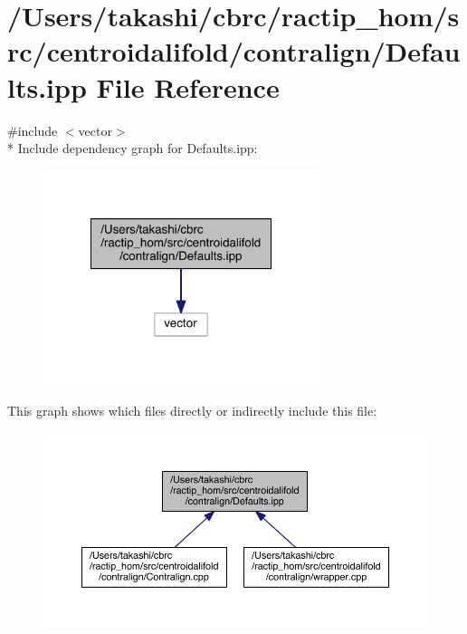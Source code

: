 \hypertarget{centroidalifold_2contralign_2_defaults_8ipp}{\section{/\+Users/takashi/cbrc/ractip\+\_\+hom/src/centroidalifold/contralign/\+Defaults.ipp File Reference}
\label{centroidalifold_2contralign_2_defaults_8ipp}
}
{\ttfamily \#include $<$vector$>$}\\*
Include dependency graph for Defaults.\+ipp\+:
\nopagebreak
\begin{figure}[H]
\begin{center}
\leavevmode
\includegraphics[width=228pt]{centroidalifold_2contralign_2_defaults_8ipp__incl}
\end{center}
\end{figure}
This graph shows which files directly or indirectly include this file\+:
\nopagebreak
\begin{figure}[H]
\begin{center}
\leavevmode
\includegraphics[width=350pt]{centroidalifold_2contralign_2_defaults_8ipp__dep__incl}
\end{center}
\end{figure}
